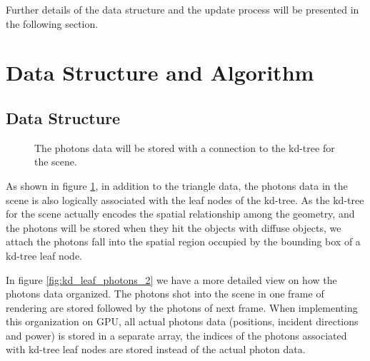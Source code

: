 Further details of the data structure and the update process will be presented in the following section.

\section{Data Structure and Algorithm}

\subsection{Data Structure}

\begin{figure}
    \centering
    \renewcommand{\thefigure}{\thechapter.\arabic{figure}}
    \caption[Association of kd-tree and photons data]{The photons data will be stored with a connection to the kd-tree for the scene. }
    \label{fig:kd_leaf_photons}
\end{figure}

As shown in figure \ref{fig:kd_leaf_photons}, in addition to the triangle data, the photons data in the scene is also logically associated with the leaf nodes of the kd-tree. As the kd-tree for the scene actually encodes the spatial relationship among the geometry, and the photons will be stored when they hit the objects with diffuse objects, we attach the photons fall into the spatial region occupied by the bounding box of a kd-tree leaf node.


In figure \ref{fig:kd_leaf_photons_2} we have a more detailed view on how the photons data organized. The photons shot into the scene in one frame of rendering are stored followed by the photons of next frame. When implementing this organization on GPU, all actual photons data (positions, incident directions and power) is stored in a separate array, the indices of the photons associated with kd-tree leaf nodes are stored instead of the actual photon data.


